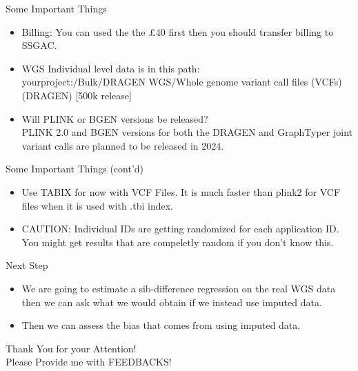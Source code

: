 \documentclass{beamer}
\begin{document}
\begin{frame}{Some Important Things}

      \begin{itemize}
            \item Billing: You can used the the \pounds 40 first then you should transfer billing to SSGAC. 
            \item WGS Individual level data is in this path:
            \\yourproject:/Bulk/DRAGEN WGS/Whole genome variant call files (VCFs) (DRAGEN) [500k release]
            \item Will PLINK or BGEN versions be released?
            \\ PLINK 2.0 and BGEN versions for both the DRAGEN and GraphTyper joint variant calls are planned to
            be released in 2024.
      \end{itemize}

\end{frame}


\begin{frame}{Some Important Things (cont'd)}

      \begin{itemize}
            \item Use TABIX for now with VCF Files. It is much faster than plink2 for VCF files when
            it is used with .tbi index.
            \item CAUTION: Individual IDs are getting randomized for each application ID.
            You might get results that are compeletly random if you don't know this.
      \end{itemize}

\end{frame}



\begin{frame}{Next Step}

      \begin{itemize}
            \item We are going to estimate a sib-difference regression on the
            real WGS data then we can ask what we would obtain if we instead use
            imputed data.
            \item Then we can assess the bias that comes from using imputed data.
            
      \end{itemize}

\end{frame}


\begin{frame}[plain]

      \huge{Thank You for your Attention!} \\
      \vspace{.5in}
      \Large{Please Provide me with FEEDBACKS!}

\end{frame}
\end{document}
